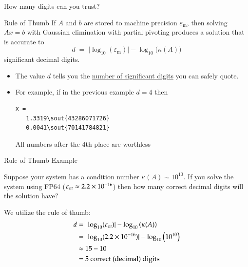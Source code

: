 \documentclass[10pt]{beamer}
\begin{document}
\begin{frame}[fragile]{How many digits can you trust?}

\begin{block}{Rule of Thumb}
If \(A\) and \(b\) are stored to machine precision \(\varepsilon_{\text{m}}\),
then solving \(Ax=b\) with Gaussian elimination with partial pivoting produces a solution
that is accurate to
\[
d \;=\; \bigl|\log_{10}(\varepsilon_{\text{m}})\bigr| - \log_{10}\!\bigl(\kappa(A)\bigr)
\]
significant decimal digits.
\end{block}

\begin{itemize}
  \item The value \(d\) tells you the \underline{number of significant digits} you
        can safely quote.

  \item For example, if in the previous example $d=4$ then 
\begin{Verbatim}[commandchars=\\\{\}]
x =
   1.3319\sout{43286071726}
   0.0041\sout{70141784821}
\end{Verbatim}
All numbers after the 4th place are worthless
\end{itemize}

\end{frame}
\begin{frame}{Rule of Thumb Example}

\begin{example}
Suppose your system has a condition number $\kappa(A)\sim10^{10}$. If you solve the system using 
FP64 ($\varepsilon_m\approx 2.2\times10^{-16}$) then how many correct decimal digits will the solution have?  
\end{example}

We utilize the rule of thumb:
\begin{align*}
	d &= | \log_{10}(\varepsilon_m)| - \log_{10}\left(\kappa(A)\right)\\
     &= | \log_{10}(2.2\times10^{-16})| - \log_{10}\left(10^{10}\right) \\
      &\approx 15 - 10  \\
      &= 5 \text{ correct (decimal) digits}
\end{align*}


\end{frame}
\end{document}
